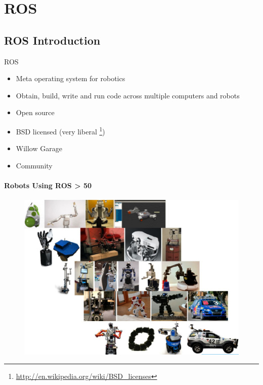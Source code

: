 
\lyxframeend{}\section{ROS}


\lyxframeend{}\subsection{ROS Introduction}


\lyxframeend{}

ROS
\begin{itemize}
\item Meta operating system for robotics
\item Obtain, build, write and run code across multiple computers and robots
\item Open source
\item BSD licensed (very liberal%
\footnote{\href{http://en.wikipedia.org/wiki/BSD_licenses}{http://en.wikipedia.org/wiki/BSD\_{}licenses}%
})
\item Willow Garage
\item Community
\end{itemize}

\lyxframeend{}


\lyxframeend{}


\framesubtitle{Robots Using ROS > 50}

\noindent \begin{center}
\begin{figure}[H]
\noindent \centering{}\includegraphics[bb=0bp -160bp 952bp 480bp,height=0.8\paperheight]{images/ROSManyRobots}
\end{figure}

\par\end{center}


